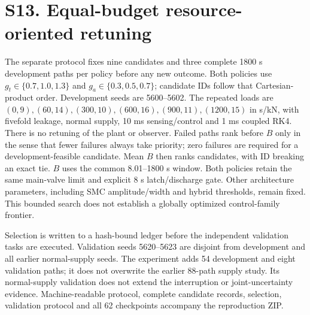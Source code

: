 \section*{S13. Equal-budget resource-oriented retuning}\renewcommand{\theHtable}{retuning.\arabic{table}}
The separate protocol fixes nine candidates and three complete 1800 s development paths per policy before any new outcome. Both policies use $g_t\in\{0.7,1.0,1.3\}$ and $g_a\in\{0.3,0.5,0.7\}$; candidate IDs follow that Cartesian-product order. Development seeds are 5600--5602. The repeated loads are $(0,9),(60,14),(300,10),(600,16),(900,11),(1200,15)$ in s/kN, with fivefold leakage, normal supply, 10 ms sensing/control and 1 ms coupled RK4. There is no retuning of the plant or observer. Failed paths rank before $B$ only in the sense that fewer failures always take priority; zero failures are required for a development-feasible candidate. Mean $B$ then ranks candidates, with ID breaking an exact tie. $B$ uses the common 8.01--1800 s window. Both policies retain the same main-valve limit and explicit 8 s latch/discharge gate. Other architecture parameters, including SMC amplitude/width and hybrid thresholds, remain fixed. This bounded search does not establish a globally optimized control-family frontier.

Selection is written to a hash-bound ledger before the independent validation tasks are executed. Validation seeds 5620--5623 are disjoint from development and all earlier normal-supply seeds. The experiment adds 54 development and eight validation paths; it does not overwrite the earlier 88-path supply study. Its normal-supply validation does not extend the interruption or joint-uncertainty evidence. Machine-readable protocol, complete candidate records, selection, validation protocol and all 62 checkpoints accompany the reproduction ZIP.

